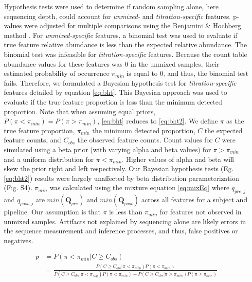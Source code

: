 \documentclass{bmcart}
\begin{document}
Hypothesis tests were used to determine if random sampling alone, here sequencing depth, could account for \emph{unmixed-} and \emph{titration-specific} features.
p-values were adjusted for multiple comparisons using the Benjamini \& Hochberg method \cite{benjamini1995controlling}.
For \emph{unmixed-specific} features, a binomial test was used to evaluate if true feature relative abundance is less than the expected relative abundance.
The binomial test was infeasible for \emph{titration-specific} features.
Because the count table abundance values for these features was 0 in the unmixed samples,
their estimated probability of occurrence $\pi_{min}$ is equal to 0,
and thus, the binomial test fails.
Therefore, we formulated a Bayesian hypothesis test for \emph{titration-specific} features detailed by equation \eqref{eq:bht}.
This Bayesian approach was used to  evaluate if the true feature proportion is less than the minimum detected proportion.
Note that when assuming equal priors, $P(\pi < \pi_{min}) = P(\pi > \pi_{min})$,
\eqref{eq:bht} reduces to \eqref{eq:bht2}.
We define $\pi$ as the true feature proportion, $\pi_{min}$ the minimum detected proportion,
$C$ the expected feature counts, and $C_{obs}$ the observed feature counts.
Count values for $C$ were simulated using a beta prior (with varying alpha and beta values) for $\pi > \pi_{min}$ and a uniform distribution for $\pi < \pi_{min}$.
Higher values of alpha and beta will skew the prior right and left respectively. Our Bayesian hypothesis tests (Eg. \eqref{eq:bht2}) results were largely unaffected by beta distribution parameterization (Fig. S4).
$\pi_{min}$ was calculated using the mixture equation \eqref{eq:mixEq} where $q_{pre,j}$ and $q_{post,j}$ are $min(\textbf{Q}_{pre})$ and $min(\textbf{Q}_{post})$ across all features for a subject and pipeline.
Our assumption is that $\pi$ is less than $\pi_{min}$ for features not observed in unmixed samples.
Artifacts not explained by sequencing alone are likely errors in the sequence measurement and inference processes, and thus, false positives or negatives.


\begin{equation}
  \begin{split}
    p & = P(\pi < \pi_{min} | C \geq C_{obs}) \\
      & = \frac{P(C \geq C_{obs}| \pi < \pi_{min})P(\pi < \pi_{min})}{P(C \geq C_{obs}| \pi < \pi_{exp})P(\pi < \pi_{min}) + P(C \geq C_{obs}| \pi \geq \pi_{min})P(\pi \geq \pi_{min})} \\
  \end{split}
  \label{eq:bht}
\end{equation}
\end{document}
